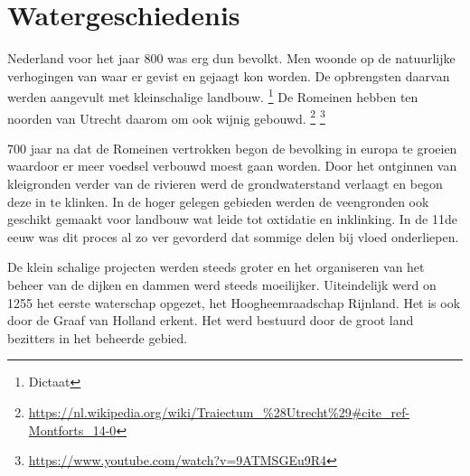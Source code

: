 \section{Watergeschiedenis}

Nederland voor het jaar 800 was erg dun bevolkt.
Men woonde op de natuurlijke verhogingen van waar er gevist en gejaagt kon worden.
De opbrengsten daarvan werden aangevult met kleinschalige landbouw.
\footnote{Dictaat}
De Romeinen hebben ten noorden van Utrecht daarom om ook wijnig gebouwd.
\footnote{\url{https://nl.wikipedia.org/wiki/Traiectum_%28Utrecht%29#cite_ref-Montforts_14-0}}
\footnote{\url{https://www.youtube.com/watch?v=9ATMSGEu9R4}}

700 jaar na dat de Romeinen vertrokken begon de bevolking in europa te groeien waardoor er meer voedsel verbouwd moest gaan worden.
Door het ontginnen van kleigronden verder van de rivieren werd de grondwaterstand verlaagt en begon deze in te klinken.
In de hoger gelegen gebieden werden de veengronden ook geschikt gemaakt voor landbouw wat leide tot oxtidatie en inklinking.
In de 11de eeuw was dit proces al zo ver gevorderd dat sommige delen bij vloed onderliepen.

De klein schalige projecten werden steeds groter en het organiseren van het beheer van de dijken en dammen werd steeds moeilijker.
Uiteindelijk werd on 1255 het eerste waterschap opgezet, het Hoogheemraadschap Rijnland.
Het is ook door de Graaf van Holland erkent.
Het werd bestuurd door de groot land bezitters in het beheerde gebied.

